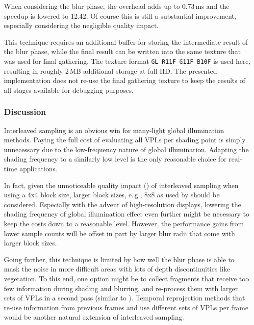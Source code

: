 When considering the blur phase, the overhead adds up to 0.73\,ms and the speedup is lowered to 12.42. Of course this is still a substantial improvement, especially considering the negligible quality impact.

This technique requires an additional buffer for storing the intermediate result of the blur phase, while the final result can be written into the same texture that was used for final gathering. The texture format \texttt{GL\_R11F\_G11F\_B10F} is used here, resulting in roughly 2\,MB additional storage at full HD. The presented implementation does not re-use the final gathering texture to keep the results of all stages available for debugging purposes.


\subsubsection{Discussion}
Interleaved sampling is an obvious win for many-light global illumination methods. Paying the full cost of evaluating all VPLs per shading point is simply unnecessary due to the low-frequency nature of global illumination. Adapting the shading frequency to a similarly low level is the only reasonable choice for real-time applications.

In fact, given the unnoticeable quality impact () of interleaved sampling when using a 4x4 block size, larger block sizes, e.\,g., 8x8 as used by \citet{hedman2016sequential} should be considered. Especially with the advent of high-resolution displays, lowering the shading frequency of global illumination effect even further might be necessary to keep the costs down to a reasonable level. However, the performance gains from lower sample counts will be offset in part by larger blur radii that come with larger block sizes.


Going further, this technique is limited by how well the blur phase is able to mask the noise in more difficult areas with lots of depth discontinuities like vegetation. To this end, one option might be to collect fragments that receive too few information during shading and blurring, and re-process them with larger sets of VPLs in a second pass (similar to \cite{Lauritzen:2010:Deferred}). Temporal reprojection methods \citep{Jimenez:2016:FilmicSMAA} that re-use information from previous frames and use different sets of VPLs per frame would be another natural extension of interleaved sampling.

\pagebreak

